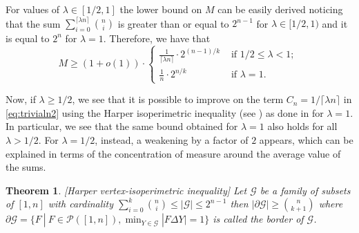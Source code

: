 \documentclass[a4paper]{amsart}
\theoremstyle{plain}
\newtheorem{Theorem}[Definition]{Theorem}
\begin{document}
For values of $\lambda \in [1/2, 1]$ the lower bound on $M$ can be easily derived noticing that the sum $\sum_{i=0}^{\lceil \lambda n \rceil} \binom{n}{i}$ is greater than or equal to $2^{n-1}$ for $\lambda \in [1/2, 1)$ and it is equal to $2^n$ for $\lambda = 1$. Therefore, we have that
\begin{equation}\label{eq:trivialn2}
M \geq (1 + o(1)) \cdot \begin{cases}
\frac{1}{\lceil \lambda n \rceil} \cdot 2^{(n-1)/k} &\mbox{ if } 1/2 \leq \lambda < 1; \\
\frac{1}{n} \cdot 2^{n/k} &\mbox{ if } \lambda = 1.
\end{cases}\,
\end{equation}
\endproof

Now, if $\lambda \geq 1/2$, we see that it is possible to improve on the term $C_n = 1 / \lceil \lambda n \rceil$ in \eqref{eq:trivialn2} using the Harper isoperimetric inequality (see \cite{Harper}) as done in \cite{Fox} for $\lambda=1$. In particular, we see that the same bound obtained for $\lambda=1$ also holds for all $\lambda>1/2$. For $\lambda=1/2$, instead, a weakening by a factor of $2$ appears, which can be explained in terms of the concentration of measure around the average value of the sums.

\begin{Theorem}\label{harper}[Harper vertex-isoperimetric inequality]
Let $\mathcal{G}$ be a family of subsets of $[1,n]$ with cardinality $\sum_{i=0}^k \binom{n}{i} \leq |\mathcal{G}| \leq 2^{n-1}$ then $|\partial \mathcal{G}| \geq \binom{n}{k+1}$ where ${\partial \mathcal{G} = \{ F \: | \: F \in \mathcal{P}([1,n]), \min_{Y \in \mathcal{G}} |F \Delta Y| = 1 \}}$ is called the border of $\mathcal{G}$.
\end{Theorem}
\end{document}

